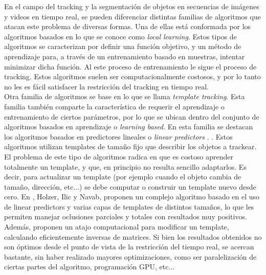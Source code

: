 \documentclass[a4paper,10pt]{article}
\begin{document}
En el campo del tracking y la segmentación de objetos en secuencias de imágenes y videos en tiempo real, se pueden diferenciar distintas familias de 
algoritmos que atacan este problema de diversas formas. Una de ellas está conformada por los algoritmos basados en lo que se conoce como \textit{local learning}.
\cite{local-learning}
Estos tipos de algoritmos se caracterizan por definir una función objetivo, y un método de aprendizaje para, a través de un entrenamiento basado en 
muestras, intentar minimizar dicha función. Al este proceso de entrenamiento le sigue el proceso de tracking. Estos algoritmos suelen ser computacionalmente costosos, y 
por lo tanto no les es fácil satisfacer la restricción del tracking en tiempo real.\\

Otra familia de algoritmos se base en lo que se llama \textit{template tracking}. Esta familia también comparte la característica de requerir el aprendizaje o entrenamiento
de ciertos parámetros, por lo que se ubican dentro del conjunto de algoritmos basados en aprendizaje o \textit{learning based}. En esta familia se destacan los algoritmos 
basados en predictores lineales o 
\textit{linear predictors} \cite{alp} \cite{original-linear-predictors}. 
\cite{CITATION NEEDED}. 
Estos algoritmos utilizan templates de tamaño fijo que describir los objetos a trackear. El problema de este tipo de algoritmos radica en que es costoso aprender 
totalmente un template, y que, en principio no resulta sencillo adaptarlos. Es decir, para actualizar un template (por ejemplo cuando el objeto cambia de tamaño, dirección, etc...)
se debe computar o construir un template nuevo desde cero. En \cite{alp}, Holzer, Ilic y Navab, proponen un complejo algoritmo basado en el uso de linear predictors y varias capas
de templates de distintos tamaños, lo que les permiten manejar oclusiones parciales y totales con resultados muy positivos. Además, proponen un atajo computacional para 
modificar un template, calculando eficientemente inversas de matrices. Si bien los resultados obtenidos no son óptimos desde el punto de vista de la restricción del tiempo real, 
se acercan bastante, sin haber realizado mayores optimizaciones, como ser paralelización de ciertas partes del algoritmo, programación GPU, etc...
\end{document}
